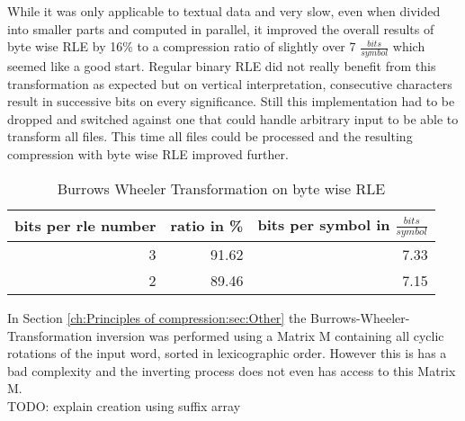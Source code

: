 \par{
While it was only applicable to textual data and very slow, even when divided into smaller parts and computed in parallel, it improved the overall results of byte wise RLE by 16\% to a compression ratio of slightly over 7 $\frac{bits}{symbol}$ which seemed like a good start. Regular binary RLE did not really benefit from this transformation as expected but on vertical interpretation, consecutive characters result in successive bits on every significance. Still this implementation had to be dropped and switched against one that could handle arbitrary input to be able to transform all files. This time all files could be processed and the resulting compression with byte wise RLE improved further.

\begin{table}[H]
	\centering
	\begin{tabular}{r|r|r}	
		bits per rle number & ratio in \% & bits per symbol in $\frac{bits}{symbol}$\\
		\hline
		3 & 91.62 & 7.33\\
		2 & 89.46 & 7.15
	\end{tabular}
	\caption{Burrows Wheeler Transformation on byte wise RLE}
	\label{tab:t12 Burrows Wheeler Transformation on byte wise RLE}
\end{table}
}

\par{
In Section \ref{ch:Principles of compression:sec:Other} the Burrows-Wheeler-Transformation inversion was performed using a Matrix M containing all cyclic rotations of the input word, sorted in lexicographic order. However this is has a bad complexity and the inverting process does not even has access to this Matrix M.\\

TODO: explain creation using suffix array \\
}

